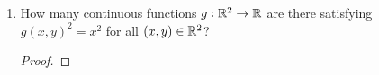 \documentclass[12pt]{article}
\begin{document}
\begin{enumerate}[label=(\roman*)]
\begin{proof}
    Specifically, let $\rho:L \to [0, 1]$ be defined by $l = u + \rho(l)(v - u)$.
  \end{proof}

  \begin{claim*}
    There are precisely two continuous functions $f:H \to \R$ satisfying $f(x, y)^2 = x^2$ for all
    $(x, y) \in H$.
  \end{claim*}
  \begin{proof}
    Examples are
    \begin{align*}
      f(x, y) &= x\\
      f(x, y) &= -x.
    \end{align*}
    \todo{}
  \end{proof}
\item
  \begin{problem*}
    How many continuous functions $g:\mathbb{R}^2 \to \mathbb{R}$ are there satisfying $g(x, y)^2 = x^2$ for all
    $(x, y) \in \mathbb{R}^2$?
  \end{problem*}
  \begin{proof}
    \todo{}
  \end{proof}
\end{enumerate}

\subsection{}
\end{document}
